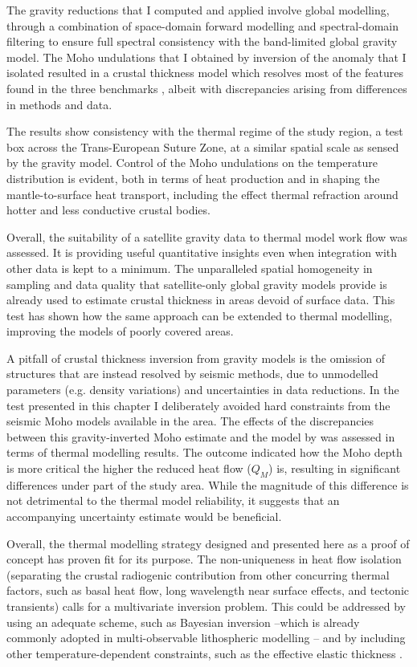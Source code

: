The gravity reductions that I computed and applied involve global modelling, through a combination of space-domain forward modelling and spectral-domain filtering to ensure full spectral consistency with the band-limited global gravity model.
The Moho undulations that I obtained by inversion of the anomaly that I isolated resulted in a crustal thickness model which resolves most of the features found in the three benchmarks \parencites{Grad2009}{Reguzzoni2015}{Pasyanos2014}, albeit with discrepancies arising from differences in methods and data.

The results show consistency with the thermal regime of the study region, a test box across the Trans-European Suture Zone, at a similar spatial scale as sensed by the gravity model.
Control of the Moho undulations on the temperature distribution is evident, both in terms of heat production and in shaping the mantle-to-surface heat transport, including the effect thermal refraction around hotter and less conductive crustal bodies.

Overall, the suitability of a satellite gravity data to thermal model work flow was assessed.
It is providing useful quantitative insights even when integration with other data is kept to a minimum.
The unparalleled spatial homogeneity in sampling and data quality that satellite-only global gravity models provide is already used to estimate crustal thickness in areas devoid of surface data.
This test has shown how the same approach can be extended to thermal modelling, improving the models of poorly covered areas.

A pitfall of crustal thickness inversion from gravity models is the omission of structures that are instead resolved by seismic methods, due to unmodelled parameters (e.g. density variations) and uncertainties in data reductions.
In the test presented in this chapter I deliberately avoided hard constraints from the seismic Moho models available in the area.
The effects of the discrepancies between this gravity-inverted Moho estimate and the model by \textcite{Grad2009} was assessed in terms of thermal modelling results.
The outcome indicated how the Moho depth is more critical the higher the reduced heat flow ($Q_M$) is, resulting in significant differences under part of the study area.
While the magnitude of this difference is not detrimental to the thermal model reliability, it suggests that an accompanying uncertainty estimate would be beneficial.

Overall, the thermal modelling strategy designed and presented here as a proof of concept has proven fit for its purpose.
The non-uniqueness in heat flow isolation (separating the crustal radiogenic contribution from other concurring thermal factors, such as basal heat flow, long wavelength near surface effects, and tectonic transients) calls for a multivariate inversion problem.
This could be addressed by using an adequate scheme, such as Bayesian inversion \parencite{Mosegaard1995} --which is already commonly adopted in multi-observable lithospheric modelling \parencite[e.g ][]{Mather2018}-- and by including other temperature-dependent constraints, such as the effective elastic thickness \parencite{Burov1995}.

